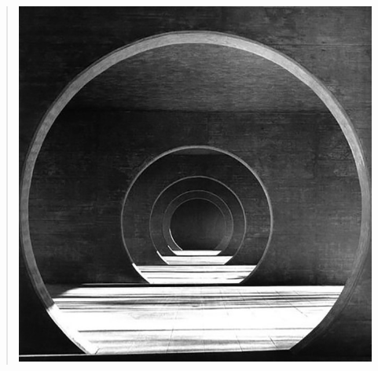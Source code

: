 \documentclass[
]{article}
\begin{document}
\begin{quote}
\includegraphics[width=4.67917in,height=4.70694in]{vertopal_2361032064654423b71b7db67d98c753/media/image2.png}
\end{quote}
\end{document}

